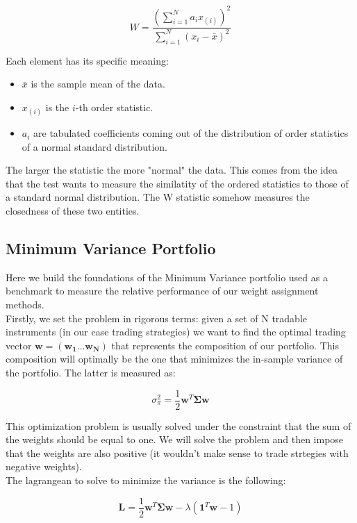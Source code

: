 \documentclass[12pt]{article} %
\numberwithin{equation}{subsection}
\begin{document}
$$
\displaystyle W = \frac{\left(\sum\limits_{i=1}^N a_{i}x_{(i)}\right)^2}{\sum\limits_{i=1}^N(x_i-\bar{x})^2}
$$

Each element has its specific meaning:
\begin{itemize}
	\item $\bar{x}$ is the sample mean of the data.
	\item $x_{(i)}$ is the $i$-th order statistic. 
	\item $a_i$ are tabulated coefficients coming out of the distribution of order statistics of a normal standard distribution.
\end{itemize}

The larger the statistic the more "normal" the data. This comes from the idea that the test wants to measure the similatity of the ordered statistics to those of a standard normal distribution. The W statistic somehow measures the closedness of these two entities.

\subsection*{Minimum Variance Portfolio}

Here we build the foundations of the Minimum Variance portfolio used as a benchmark to measure the relative performance of our weight assignment methods.\\
Firstly, we set the problem in rigorous terms: given a set of N tradable instruments (in our case trading strategies) we want to find the optimal trading vector $\mathbf{w} = (\mathbf{w_1} \dots \mathbf{w_N})$ that represents the composition of our portfolio. This composition will optimally be the one that minimizes the in-sample variance of the portfolio. The latter is measured as:

$$
\sigma^2_\pi = \frac{1}{2} \mathbf{w}^T\mathbf{\Sigma} \mathbf{w}
$$

This optimization problem is usually solved under the constraint that the sum of the weights should be equal to one. We will solve the problem and then impose that the weights are also positive (it wouldn't make sense to trade strtegies with negative weights).\\
The lagrangean to solve to minimize the variance is the following:

$$
\mathbf{L} = \frac{1}{2} \mathbf{w}^T\mathbf{\Sigma} \mathbf{w} - \lambda\left(\mathbf{1}^T\mathbf{w} - 1\right)
$$
\end{document}
